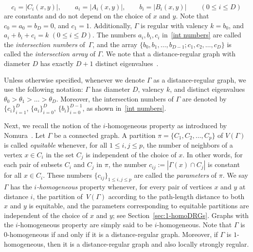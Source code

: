 \begin{equation}\label{int numbers}
	c_i =|C_i(x,y)|, \qquad a_i = |A_i(x,y)|, \qquad b_i=|B_i(x,y)| \qquad (0\leqslant i \leqslant D)
\end{equation}
are constants and do not depend on the choice of $x$ and $y$.
Note that $c_0=a_0=b_D=0$, and $c_1=1$. 
Additionally, $\Gamma$ is regular with valency $k=b_0$, and $a_i+b_i +c_i = k$ $(0\leqslant i \leqslant D)$.
The numbers $a_i, b_i, c_i$ in~\eqref{int numbers} are called the \emph{intersection numbers} of~$\Gamma$, and the array $\{b_0, b_1,\ldots , b_{D-1}; c_1, c_2,\ldots , c_D\}$ is called the {\em intersection array} of  $\Gamma$.
We note that a distance-regular graph with diameter $D$ has exactly $D+1$ distinct eigenvalues~\cite[Proposition 2.6]{DaKoTa}.

\begin{nota}
Unless otherwise specified, whenever we denote $\Gamma$ as a distance-regular graph, we use the following notation: $\Gamma$ has diameter $D$, valency $k$, and distinct eigenvalues $\theta_0 > \theta_1 > \ldots > \theta_D$. 
Moreover, the intersection numbers of $\Gamma$ are denoted by $\{c_i\}^D_{i=1}$, $\{a_i\}^D_{i=0}$, $\{b_i\}^{D-1}_{i=0}$, as shown in~\eqref{int numbers}.
\end{nota}

Next, we recall the notion of the $i$-homogeneous property as introduced by Nomura~\cite{Nomura1994}.
Let $\Gamma$ be a connected graph.
A partition $\pi = \{ C_1, C_2, \ldots, C_p \}$ of $V(\Gamma)$ is called \emph{equitable} whenever, for all $1 \leqslant i, j \leqslant p$, the number of neighbors of a vertex $x\in C_i$ in the set $C_j$ is independent of the choice of $x$.
In other words, for each pair of subsets $C_i$ and $C_j$ in $\pi$, the number $c_{ij} := | \Gamma(x) \cap C_j |$ is constant for all $x\in C_i$.  
These numbers $\{c_{ij}\}_{1\leqslant i,j \leqslant p}$ are called the \emph{parameters} of $\pi$.
We say $\Gamma$ has the \emph{$i$-homogeneous} property whenever, for every pair of vertices $x$ and $y$ at distance $i$, the partition of~$V(\Gamma)$ according to the path-length distance to both $x$ and $y$ is equitable, and the parameters corresponding to equitable partitions are independent of the choice of $x$ and $y$; see Section~\ref{sec:1-homoDRGs}. 
Graphs with the $i$-homogeneous property are simply said to be $i$-homogeneous.
Note that $\Gamma$ is $0$-homogeneous if and only if it is a distance-regular graph.
Moreover, if $\Gamma$ is $1$-homogeneous, then it is a distance-regular graph and also locally strongly regular.

